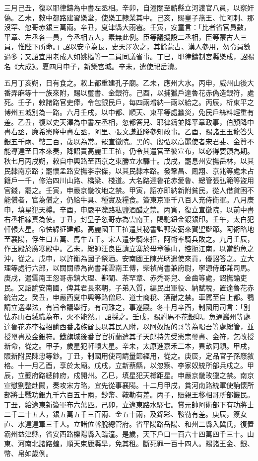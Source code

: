 \begin{pinyinscope}
 三月己丑，復以耶律鑄為中書左丞相。辛卯，自潼關至蘄縣立河渡官八員，以察奸偽。乙未，敕中都路建習樂堂，使樂工隸業其中。己亥，賜皇子燕王、忙阿剌、那沒罕、忽哥赤銀三萬兩。辛丑，夏津縣大雨雹。壬寅，安童言：「比者省官員數，平章、左丞各一員，今丞相五人，素無此例。臣等議擬設二丞相，臣等蒙古人三員，惟陛下所命。」詔以安童為長，史天澤次之，其餘蒙古、漢人參用，勿令員數過多；又詔宜用老成人如姚樞等一二員同議省事。丁巳，耶律鑄制宮縣樂成，詔賜名《大成》。夏四月申子，新築宮城。辛未，遣使祀岳瀆。



 五月丁亥朔，日有食之。敕上都重建孔子廟。乙未，應州大水。丙申，威州山後大番弄麻等十一族來附，賜以璽書、金銀符。己酉，以捕獵戶達魯花赤偽造銀符，處死。壬子，敕諸路官吏俸，令包銀民戶，每四兩增納一兩以給之。丙辰，析東平之博州五城別為一路。六月壬戌，以中都、順天、東平等處蠶災，免民戶絲料輕重有差。乙丑，復以史天澤為中書左丞相，忽都答兒、耶律鑄並降平章政事，伯顏降中書右丞，廉希憲降中書左丞，阿里、張文謙並降參知政事。乙酉，賜諸王玉龍答失銀五千兩、幣三百，歲以為常。罷宣徽院。黑的、殷弘以高麗使者宋君斐、金贊不能導達至日本來奏，降詔責高麗王王禃，仍令其遣官至彼宣布，以必得要領為期。秋七月丙戌朔，敕自中興路至西京之東勝立水驛十。戊戌，罷息州安撫岳林，以其民隸南京路；罷懷孟路安撫李宗傑，以其民隸本路。發鞏昌、鳳翔、京兆等處未占籍戶一千，修治四川山路、橋梁、棧道。大名路達魯花赤愛魯、總管張弘範等盜用官錢，罷之。壬寅，申嚴京畿牧地之禁。甲寅，詔亦即納新附貧民，從人借貸困不能償者，官為償之，仍給牛具、種實及糧食。簽東京軍千八百人充侍衛軍。八月庚申，填星犯天樽。辛酉，申嚴平灤路私鹽酒醋之禁。丙寅，復立宣徽院，以前中書右丞相線真為使。丁丑，封皇子忽哥赤為雲南王，賜駝鈕金鍍銀印。壬午，太白犯軒轅大星。命怯綿征建都。高麗國王王禃遣其秘書監郭汝弼來賀聖誕節。阿術略地至襄陽，俘生口五萬、馬牛五千。宋人遣步騎來拒，阿術率騎兵敗之。九月壬辰，作玉殿於廣寒殿中。乙未，總帥汪良臣請立寨於毋章德山，控扼江南，以當釣魚之沖，從之。戊申，以許衡為國子祭酒。安南國王陳光昞遣使來貢，優詔答之。立大理等處行六部，以闊闊帶為尚書兼雲南王傅，柴禎尚書兼府尉，寧源侍郎兼司馬。庚戌，遣雲南王忽哥赤鎮大理、鄯闡、茶罕章、赤禿哥兒、金齒等處，詔撫諭吏民。又詔諭安南國，俾其君長來朝，子弟入質，編民出軍役、納賦稅，置達魯花赤統治之。癸丑，申嚴西夏中興等路僧尼、道士商稅、酒醋之禁。車駕至自上都。鶚請立選舉法，有旨令議舉行，有司難之，事遂寢。冬十月辛酉，制國用司言：「別怯赤山石絨織為布，火不能然。」詔採之。壬戌，賜駙馬不花銀印。魚通巖州等處達魯花赤李福招諭西番諸族酋長以其民入附，以阿奴版的哥等為喝吾等處總管，並授璽書及金銀符。鐵旗城後番官官折蘭遣其子天郎持先受憲宗璽書、金符，乞改授新命，從之。甲子，歲星犯軒轅大星。辛未，太原進嘉禾二本，異畝同穎。甲戌，賑新附民陳忠等鈔。丁丑，制國用使司請量節經用，從之。庚辰，定品官子孫廕敘格。十一月乙酉，享於太廟。戊戌，立新蔡縣，以忽察、李家奴統所部兵戍之。甲辰，立夔府路總帥府，戍開州。乙巳，填星犯天樽距星。申嚴京畿畋獵之禁。南京宣慰劉整赴闕，奏攻宋方略，宜先從事襄陽。十二月甲戌，賞河南路統軍使訥懷所部將士戰功銀九千六百五十兩，鈔幣、鞍勒有差。丙子，賑親王移相哥所部饑民。丁丑，給遼東新簽軍布六萬匹。己卯，立遼東路水驛七。賞元帥阿術部下有功將士二千二十五人，銀五萬五千三百兩、金五十兩，及錦彩、鞍勒有差。庚辰，簽女直、水達達軍三千人。立諸位斡脫總管府。省平陽路岳陽、和州二縣入冀氏，復置霸州益津縣，省安西路櫟陽縣入臨潼。是歲，天下戶口一百六十四萬四千三十。山東、河南北諸路蝗，順天束鹿縣旱，免其租。斷死罪一百十四人。賜諸王金、銀、幣、帛如歲例。

\end{pinyinscope}
